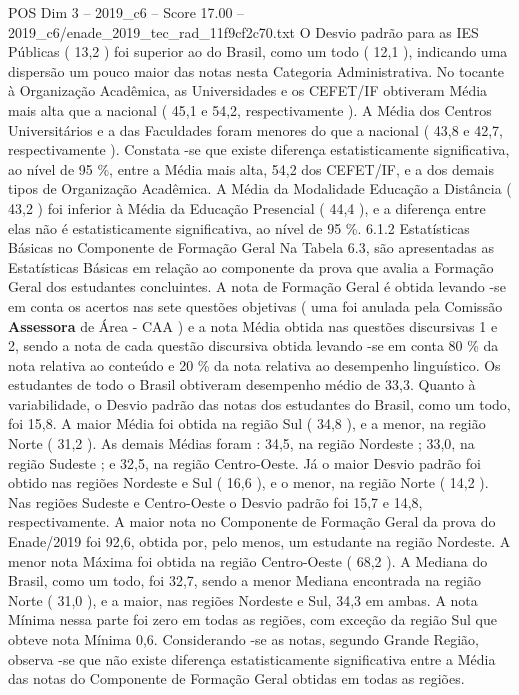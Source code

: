 \begin{textsample}{POS Dim 3 – 2019\_c6 – Score 17.00 – 2019\_c6/enade\_2019\_tec\_rad\_11f9cf2c70.txt}
O Desvio padrão para as IES Públicas ( 13,2 ) foi superior ao do Brasil, como um todo ( 12,1 ), indicando uma dispersão um pouco maior das notas nesta Categoria Administrativa.
No tocante à Organização Acadêmica, as Universidades e os CEFET/IF obtiveram Média mais alta que a nacional ( 45,1 e 54,2, respectivamente ).
A Média dos Centros Universitários e a das Faculdades foram menores do que a nacional ( 43,8 e 42,7, respectivamente ).
Constata -se que existe diferença estatisticamente significativa, ao nível de 95 \%, entre a Média mais alta, 54,2 dos CEFET/IF, e a dos demais tipos de Organização Acadêmica.
A Média da Modalidade Educação a Distância ( 43,2 ) foi inferior à Média da Educação Presencial ( 44,4 ), e a diferença entre elas não é estatisticamente significativa, ao nível de 95 \%. 6.1.2 Estatísticas Básicas no Componente de Formação Geral Na Tabela 6.3, são apresentadas as Estatísticas Básicas em relação ao componente da prova que avalia a Formação Geral dos estudantes concluintes.
A nota de Formação Geral é obtida levando -se em conta os acertos nas sete questões objetivas ( uma foi anulada pela Comissão \textbf{Assessora} de Área - CAA ) e a nota Média obtida nas questões discursivas 1 e 2, sendo a nota de cada questão discursiva obtida levando -se em conta 80 \% da nota relativa ao conteúdo e 20 \% da nota relativa ao desempenho linguístico.
Os estudantes de todo o Brasil obtiveram desempenho médio de 33,3.
Quanto à variabilidade, o Desvio padrão das notas dos estudantes do Brasil, como um todo, foi 15,8.
A maior Média foi obtida na região Sul ( 34,8 ), e a menor, na região Norte ( 31,2 ).
As demais Médias foram : 34,5, na região Nordeste ; 33,0, na região Sudeste ; e 32,5, na região Centro-Oeste.
Já o maior Desvio padrão foi obtido nas regiões Nordeste e Sul ( 16,6 ), e o menor, na região Norte ( 14,2 ).
Nas regiões Sudeste e Centro-Oeste o Desvio padrão foi 15,7 e 14,8, respectivamente.
A maior nota no Componente de Formação Geral da prova do Enade/2019 foi 92,6, obtida por, pelo menos, um estudante na região Nordeste.
A menor nota Máxima foi obtida na região Centro-Oeste ( 68,2 ).
A Mediana do Brasil, como um todo, foi 32,7, sendo a menor Mediana encontrada na região Norte ( 31,0 ), e a maior, nas regiões Nordeste e Sul, 34,3 em ambas.
A nota Mínima nessa parte foi zero em todas as regiões, com exceção da região Sul que obteve nota Mínima 0,6.
Considerando -se as notas, segundo Grande Região, observa -se que não existe diferença estatisticamente significativa entre a Média das notas do Componente de Formação Geral obtidas em todas as regiões.

\end{textsample}
